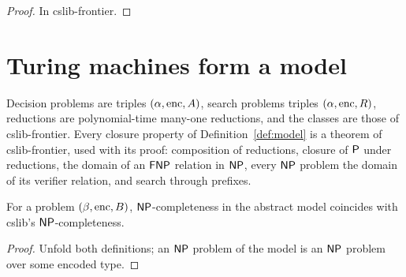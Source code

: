 \begin{proof}
  \leanok
  In cslib-frontier.
\end{proof}

\section{Turing machines form a model}

\begin{definition}
  \label{def:tmModel}
  \leanok
  Decision problems are triples $(\alpha, \mathrm{enc}, A)$, search problems triples $(\alpha, \mathrm{enc}, R)$,
  reductions are polynomial-time many-one reductions, and the classes are those of cslib-frontier.
  Every closure property of Definition~\ref{def:model} is a theorem of cslib-frontier, used with its
  proof: composition of reductions, closure of $\mathsf{P}$ under reductions, the domain of an $\mathsf{FNP}$
  relation in $\mathsf{NP}$, every $\mathsf{NP}$ problem the domain of its verifier relation, and search through
  prefixes.
\end{definition}

\begin{lemma}
  \label{lem:npComplete-iff}
  \leanok
  For a problem $(\beta, \mathrm{enc}, B)$, $\mathsf{NP}$-completeness in the abstract model coincides with
  cslib's $\mathsf{NP}$-completeness.
\end{lemma}

\begin{proof}
  \leanok
  Unfold both definitions; an $\mathsf{NP}$ problem of the model is an $\mathsf{NP}$ problem over some encoded type.
\end{proof}
